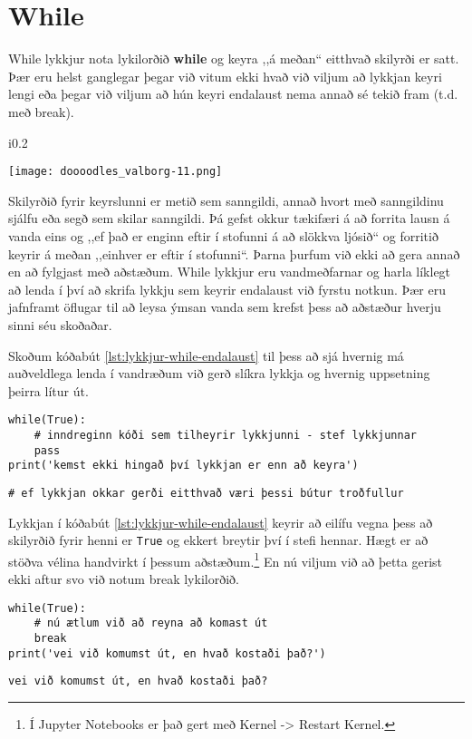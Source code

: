 \section{While}
While lykkjur nota lykilorðið \textbf{while} og keyra ,,á meðan“ eitthvað skilyrði er satt.
Þær eru helst ganglegar þegar við vitum ekki hvað við viljum að lykkjan keyri lengi eða þegar við viljum að hún keyri endalaust nema annað sé tekið fram (t.d. með break).

\begin{wrapfigure}{i}{0.2\textwidth} %
	\begin{center}
		\texttt{[image: doooodles\_valborg-11.png]}
	\end{center}
\end{wrapfigure}
Skilyrðið fyrir keyrslunni er metið sem sanngildi, annað hvort með sanngildinu sjálfu eða segð sem skilar sanngildi.
Þá gefst okkur tækifæri á að forrita lausn á vanda eins og ,,ef það er enginn eftir í stofunni á að slökkva ljósið“ og forritið keyrir á meðan ,,einhver er eftir í stofunni“.
Þarna þurfum við ekki að gera annað en að fylgjast með aðstæðum.
While lykkjur eru vandmeðfarnar og harla líklegt að lenda í því að skrifa lykkju sem keyrir endalaust við fyrstu notkun.
Þær eru jafnframt öflugar til að leysa ýmsan vanda sem krefst þess að aðstæður hverju sinni séu skoðaðar.

Skoðum kóðabút \ref{lst:lykkjur-while-endalaust} til þess að sjá hvernig má auðveldlega lenda í vandræðum við gerð slíkra lykkja og hvernig uppsetning þeirra lítur út.


\begin{lstlisting}[caption=while lykkja sem keyrir að eilífu, label=lst:lykkjur-while-endalaust]
while(True):
	# inndreginn kóði sem tilheyrir lykkjunni - stef lykkjunnar
	pass
print('kemst ekki hingað því lykkjan er enn að keyra')
\end{lstlisting}
\lstset{style=uttak}
\begin{lstlisting}
# ef lykkjan okkar gerði eitthvað væri þessi bútur troðfullur
\end{lstlisting}
\lstset{style=venjulegt}
Lykkjan í kóðabút \ref{lst:lykkjur-while-endalaust} keyrir að eilífu vegna þess að skilyrðið fyrir henni er \texttt{True} og ekkert breytir því í stefi hennar.
Hægt er að stöðva vélina handvirkt í þessum aðstæðum.\footnote{Í Jupyter Notebooks er það gert með Kernel -> Restart Kernel.}
En nú viljum við að þetta gerist ekki aftur svo við notum break lykilorðið.


\begin{lstlisting}[caption=while lykkja sem keyrir ekki að eilífu en hún gerir ekkert, label=lst:lykkjur-while-break]
while(True):
	# nú ætlum við að reyna að komast út
	break
print('vei við komumst út, en hvað kostaði það?')
\end{lstlisting}
\lstset{style=uttak}
\begin{lstlisting}
vei við komumst út, en hvað kostaði það?
\end{lstlisting}
\lstset{style=venjulegt}

